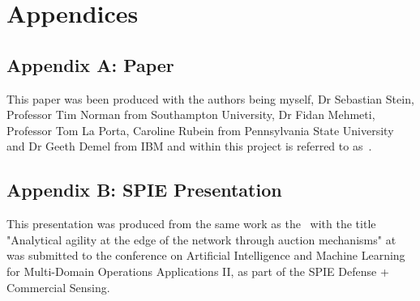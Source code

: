 \chapter*{Appendices}
\section*{Appendix A: Paper} \label{app:aamas_paper}
This paper was been produced with the authors being myself, Dr Sebastian Stein, Professor Tim Norman from Southampton
University, Dr Fidan Mehmeti, Professor Tom La Porta, Caroline Rubein from Pennsylvania State University and Dr Geeth
Demel from IBM and within this project is referred to as~\cite{FlexibleResourceAllocation}.










\section*{Appendix B: SPIE Presentation} \label{app:spie_presentation}
This presentation was produced from the same work as the~\cite{FlexibleResourceAllocation} with the title "Analytical
agility at the edge of the network through auction mechanisms" at was submitted to the conference on Artificial
Intelligence and Machine Learning for Multi-Domain Operations Applications II, as part of the SPIE Defense + Commercial
Sensing.














